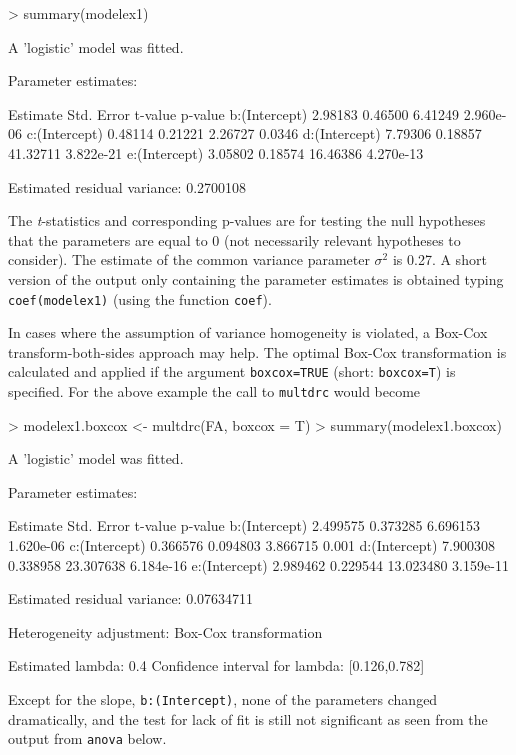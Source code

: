 \documentclass[a4paper]{article}
\begin{document}
\begin{Schunk}
\begin{Sinput}
> summary(modelex1)
\end{Sinput}
\begin{Soutput}
A 'logistic' model was fitted.

Parameter estimates:

              Estimate Std. Error  t-value   p-value
b:(Intercept)  2.98183    0.46500  6.41249 2.960e-06
c:(Intercept)  0.48114    0.21221  2.26727    0.0346
d:(Intercept)  7.79306    0.18857 41.32711 3.822e-21
e:(Intercept)  3.05802    0.18574 16.46386 4.270e-13

Estimated residual variance: 0.2700108 
\end{Soutput}
\end{Schunk}
The \emph{t}-statistics and corresponding p-values are for testing the null hypotheses that the parameters are equal to 0 (not
necessarily relevant hypotheses to consider). The estimate of the common variance parameter $\sigma^2$ is 
0.27.
A short version of the output only containing the parameter estimates is obtained typing \verb+coef(modelex1)+ (using the function \verb+coef+).



In cases where the assumption of variance homogeneity is violated, a Box-Cox transform-both-sides approach may help. The optimal
Box-Cox transformation is calculated and applied if the argument \verb+boxcox=TRUE+ (short: \verb+boxcox=T+) is specified. For the
above example the call to \verb+multdrc+ would become

\begin{Schunk}
\begin{Sinput}
> modelex1.boxcox <- multdrc(FA, boxcox = T)
> summary(modelex1.boxcox)
\end{Sinput}
\begin{Soutput}
A 'logistic' model was fitted.

Parameter estimates:

               Estimate Std. Error   t-value   p-value
b:(Intercept)  2.499575   0.373285  6.696153 1.620e-06
c:(Intercept)  0.366576   0.094803  3.866715     0.001
d:(Intercept)  7.900308   0.338958 23.307638 6.184e-16
e:(Intercept)  2.989462   0.229544 13.023480 3.159e-11

Estimated residual variance: 0.07634711 

Heterogeneity adjustment: Box-Cox transformation

Estimated lambda: 0.4 
Confidence interval for lambda: [0.126,0.782] 
\end{Soutput}
\end{Schunk}
Except for the slope, \verb+b:(Intercept)+, none of the parameters changed dramatically, and the test for lack of fit is still not significant as seen from the
output from \verb+anova+ below.
\end{document}

